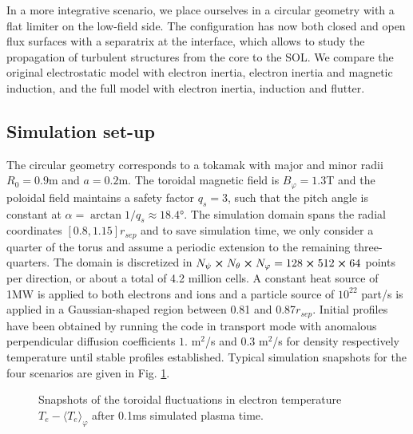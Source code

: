 In a more integrative scenario, we place ourselves in a circular geometry with a flat limiter on the low-field side. The configuration has now both closed and open flux surfaces with a separatrix at the interface, which allows to study the propagation of turbulent structures from the core to the SOL. We compare the original electrostatic model with electron inertia, electron inertia and magnetic induction, and the full model with electron inertia, induction and flutter.

\subsection{Simulation set-up}

The circular geometry corresponds to a tokamak with major and minor radii $R_0 = 0.9$m and $a=0.2$m. The toroidal magnetic field is $B_\varphi = 1.3$T and the poloidal field maintains a safety factor $q_s=3$, such that the pitch angle is constant at $\alpha = \arctan1/q_s \approx 18.4°$. The simulation domain spans the radial coordinates $[0.8,1.15]r_{sep}$ and to save simulation time, we only consider a quarter of the torus and assume a periodic extension to the remaining three-quarters. The domain is discretized in $N_\psi\cross N_\theta \cross N_\varphi = 128\cross512\cross64$ points per direction, or about a total of 4.2 million cells. A constant heat source of 1MW is applied to both electrons and ions and a particle source of $10^{22}$ part/s is applied in a Gaussian-shaped region between 0.81 and 0.87$r_{sep}$. Initial profiles have been obtained by running the code in transport mode with anomalous perpendicular diffusion coefficients $1.$ m$^2$/s and $0.3$ m$^2$/s for density respectively temperature until stable profiles established. Typical simulation snapshots for the four scenarios are given in Fig. \ref{fig:anal_CIRC_fluctT}.

\begin{figure}[H]\centering
	\centering
	\caption{Snapshots of the toroidal fluctuations in electron temperature $T_e - \langle T_e\rangle_\varphi$ after 0.1ms simulated plasma time.}
	\label{fig:anal_CIRC_fluctT}
\end{figure}


